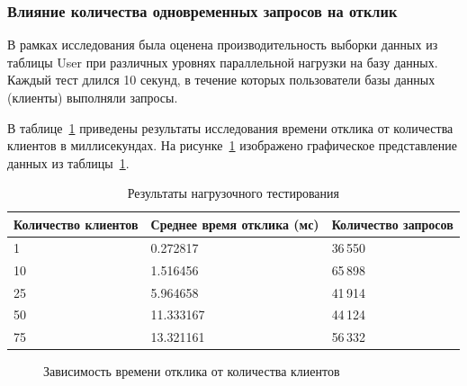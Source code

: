 \subsubsection*{\normalsize Влияние количества одновременных запросов на отклик}

В рамках исследования была оценена производительность выборки данных из таблицы User при различных уровнях параллельной нагрузки на базу данных. 
Каждый тест длился 10 секунд, в течение которых пользователи базы данных (клиенты) выполняли запросы.

В таблице~\ref{operation-times2} приведены результаты исследования времени отклика от количества клиентов в миллисекундах. На рисунке~\ref{grp:dr2} изображено графическое представление данных из таблицы~\ref{operation-times2}.


\begin{table}[h!]
	\centering
	\caption{Результаты нагрузочного тестирования}
	\begin{tabular}{|p{3.5cm}|p{4.5cm}|p{3.5cm}|}
		\hline
		\textbf{Количество клиентов} & \textbf{Среднее время отклика (мс)} & \textbf{Количество запросов} \\
		\hline
		1  & 0.272817  & 36\,550 \\
		10 & 1.516456  & 65\,898 \\
		25 & 5.964658  & 41\,914 \\
		50 & 11.333167 & 44\,124 \\
		75 & 13.321161 & 56\,332 \\
		\hline
	\end{tabular}
	\label{operation-times2}
\end{table}

\begin{figure}[ht!]
	\begin{center}
	\end{center}
	\caption{Зависимость времени отклика от количества клиентов}
	\label{grp:dr2}
\end{figure}

